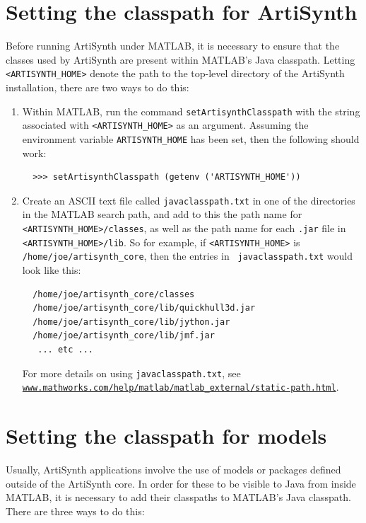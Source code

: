 \documentclass{article}
\begin{document}
\section{Setting the classpath for ArtiSynth}
\label{ArtisynthClasspath:sec}

Before running ArtiSynth under MATLAB, it is necessary to ensure that
the classes used by ArtiSynth are present within MATLAB's Java
classpath. Letting {\tt <ARTISYNTH\_HOME>} denote the path to the
top-level directory of the ArtiSynth installation, there are
two ways to do this:

\begin{enumerate}

\item Within MATLAB, run the command {\tt setArtisynthClasspath} with
the string associated with {\tt <ARTISYNTH\_HOME>} as an argument.
Assuming the environment variable {\tt ARTISYNTH\_HOME} has been
set, then the following should work:
%
\begin{verbatim}
  >>> setArtisynthClasspath (getenv ('ARTISYNTH_HOME'))
\end{verbatim}
%

\item Create an ASCII text file called {\tt javaclasspath.txt} in one
of the directories in the MATLAB search path, and add to
this the path name for {\tt <ARTISYNTH\_HOME>/classes}, as well as the
path name for each {\tt .jar} file in {\tt <ARTISYNTH\_HOME>/lib}.  So
for example, if {\tt <ARTISYNTH\_HOME>} is {\tt
/home/joe/artisynth\_core}, then the entries in {\tt
javaclasspath.txt} would look like this:
%
\begin{verbatim}
  /home/joe/artisynth_core/classes
  /home/joe/artisynth_core/lib/quickhull3d.jar
  /home/joe/artisynth_core/lib/jython.jar
  /home/joe/artisynth_core/lib/jmf.jar
   ... etc ...
\end{verbatim}
%
For more details on using {\tt javaclasspath.txt}, see\\
\href{https://www.mathworks.com/help/matlab/matlab_external/static-path.html}
{\tt www.mathworks.com/help/matlab/matlab\_external/static-path.html}.

\end{enumerate}

\section{Setting the classpath for models}
\label{ModelClasspath:sec}

Usually, ArtiSynth applications involve the use of models or packages
defined outside of the ArtiSynth core. In order for these to be
visible to Java from inside MATLAB, it is necessary to add their
classpaths to MATLAB's Java classpath. There are three ways to do this:
\end{document}
